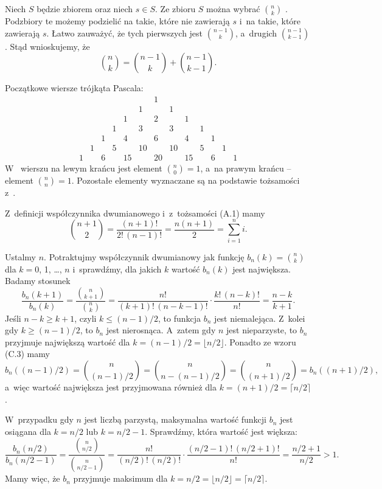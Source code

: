 \exercise %
Niech $S$ będzie zbiorem  oraz niech $s\in S$.
Ze zbioru $S$ można wybrać $\binom{n}{k}$ .
Podzbiory te możemy podzielić na takie, które nie zawierają $s$ i~na takie, które zawierają $s$.
Łatwo zauważyć, że tych pierwszych jest $\binom{n-1}{k}$, a~drugich $\binom{n-1}{k-1}$.
Stąd wnioskujemy, że
\[
    \binom{n}{k} = \binom{n-1}{k}+\binom{n-1}{k-1}.
\]

\exercise %
Początkowe wiersze trójkąta Pascala:
\[
	\begin{array}{ccccccccccccc}
		&&&&&& 1 \\
		&&&&& 1 && 1 \\
		&&&& 1 && 2 && 1 \\
		&&& 1 && 3 && 3 && 1 \\
		&& 1 && 4 && 6 && 4 && 1 \\
		& 1 && 5 && 10 && 10 && 5 && 1 \\
		1 && 6 && 15 && 20 && 15 && 6 && 1
	\end{array}
\]
W~ wierszu na lewym krańcu jest element $\binom{n}{0}=1$, a~na prawym krańcu -- element $\binom{n}{n}=1$.
Pozostałe elementy wyznaczane są na podstawie tożsamości z~.

\exercise %
Z~definicji współczynnika dwumianowego i~z~tożsamości (A.1) mamy
\[
	\binom{n+1}{2} = \frac{(n+1)!}{2!\,(n-1)!} = \frac{n(n+1)}{2} = \sum_{i=1}^ni.
\]

\exercise %
Ustalmy $n$.
Potraktujmy współczynnik dwumianowy jak funkcję $b_n(k)=\binom{n}{k}$ dla $k=0$, 1, \dots, $n$ i~sprawdźmy, dla jakich $k$ wartość $b_n(k)$ jest największa.
Badamy stosunek
\[
	\frac{b_n(k+1)}{b_n(k)} = \frac{\binom{n}{k+1}}{\binom{n}{k}} = \frac{n!}{(k+1)!\,(n-k-1)!}\cdot\frac{k!\,(n-k)!}{n!} = \frac{n-k}{k+1}.
\]
Jeśli $n-k\ge k+1$, czyli $k\le(n-1)/2$, to funkcja $b_n$ jest niemalejąca.
Z~kolei gdy $k\ge(n-1)/2$, to $b_n$ jest nierosnąca.
A~zatem gdy $n$ jest nieparzyste, to $b_n$ przyjmuje największą wartość dla $k=(n-1)/2=\lfloor n/2\rfloor$.
Ponadto ze wzoru (C.3) mamy
\[
    b_n((n-1)/2) = \binom{n}{(n-1)/2} = \binom{n}{n-(n-1)/2} = \binom{n}{(n+1)/2} = b_n((n+1)/2),
\]
a~więc wartość największa jest przyjmowana również dla $k=(n+1)/2=\lceil n/2\rceil$.

W~przypadku gdy $n$ jest liczbą parzystą, maksymalna wartość funkcji $b_n$ jest osiągana dla $k=n/2$ lub $k=n/2-1$.
Sprawdźmy, która wartość jest większa:
\[
    \frac{b_n(n/2)}{b_n(n/2-1)} = \frac{\binom{n}{n/2}}{\binom{n}{n/2-1}} = \frac{n!}{(n/2)!\,(n/2)!}\cdot\frac{(n/2-1)!\,(n/2+1)!}{n!} = \frac{n/2+1}{n/2} > 1.
\]
Mamy więc, że $b_n$ przyjmuje maksimum dla $k=n/2=\lfloor n/2\rfloor=\lceil n/2\rceil$.

